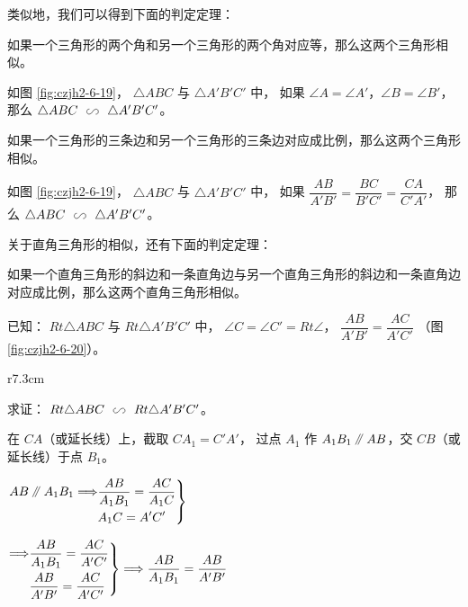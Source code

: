 \begin{enhancedline}
类似地，我们可以得到下面的判定定理：

\begin{dingli}[三角形相似的判定定理2]
    如果一个三角形的两个角和另一个三角形的两个角对应等，那么这两个三角形相似。
\end{dingli}

如图 \ref{fig:czjh2-6-19}， $\triangle ABC$ 与 $\triangle A'B'C'$ 中，
如果 $\angle A = \angle A'$，$\angle B = \angle B'$，
那么 $\triangle ABC \xiangsi \triangle A'B'C'$。

\begin{dingli}[三角形相似的判定定理3]
    如果一个三角形的三条边和另一个三角形的三条边对应成比例，那么这两个三角形相似。
\end{dingli}

如图 \ref{fig:czjh2-6-19}， $\triangle ABC$ 与 $\triangle A'B'C'$ 中，
如果 $\dfrac{AB}{A'B'} = \dfrac{BC}{B'C'} = \dfrac{CA}{C'A'}$，
那么 $\triangle ABC \xiangsi \triangle A'B'C'$。

关于直角三角形的相似，还有下面的判定定理：

\begin{dingli}[定理]
    如果一个直角三角形的斜边和一条直角边与另一个直角三角形的斜边和一条直角边对应成比例，那么这两个直角三角形相似。
\end{dingli}

已知： $Rt \triangle ABC$ 与 $Rt \triangle A'B'C'$ 中，
$\angle C = \angle C' = Rt \angle$， $\dfrac{AB}{A'B'} = \dfrac{AC}{A'C'}$ （图 \ref{fig:czjh2-6-20}）。

\begin{wrapfigure}[5]{r}{7.3cm}
    \centering
    
    \caption{}\label{fig:czjh2-6-20}
\end{wrapfigure}

求证： $Rt \triangle ABC \xiangsi Rt \triangle A'B'C'$。

\zhengming 在 $CA$（或延长线）上，截取 $CA_1 = C'A'$，
过点 $A_1$ 作 $A_1B_1 \pingxing AB$，交 $CB$（或延长线）于点 $B_1$。

$\left.\begin{aligned}
    AB \pingxing A_1B_1 \tuichu & \dfrac{AB}{A_1B_1} = \dfrac{AC}{A_1C} \\
                             & A_1C = A'C'
\end{aligned}\right\}$

\qquad $\left.\begin{aligned}
    \Longrightarrow & \dfrac{AB}{A_1B_1} = \dfrac{AC}{A'C'} \\
            & \dfrac{AB}{A'B'} = \dfrac{AC}{A'C'}
\end{aligned}\right\} \Longrightarrow \dfrac{AB}{A_1B_1} = \dfrac{AB}{A'B'}$


\end{enhancedline}
